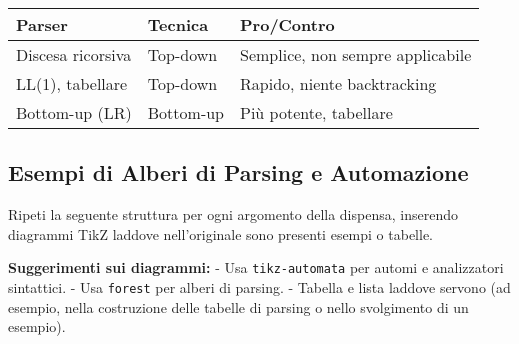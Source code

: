 \begin{table}[h!]
\centering
\begin{tabular}{l|l|l}
Parser & Tecnica & Pro/Contro \\
\hline
Discesa ricorsiva & Top-down & Semplice, non sempre applicabile\\
LL(1), tabellare  & Top-down & Rapido, niente backtracking\\
Bottom-up (LR)    & Bottom-up & Più potente, tabellare\\
\end{tabular}
\end{table}

\subsection{Esempi di Alberi di Parsing e Automazione}

\begin{center}
\end{center}

\vspace{1em}
Ripeti la seguente struttura per ogni argomento della dispensa, inserendo diagrammi TikZ laddove nell’originale sono presenti esempi o tabelle.

\textbf{Suggerimenti sui diagrammi:}
- Usa \texttt{tikz-automata} per automi e analizzatori sintattici.
- Usa \texttt{forest} per alberi di parsing.
- Tabella e lista laddove servono (ad esempio, nella costruzione delle tabelle di parsing o nello svolgimento di un esempio).